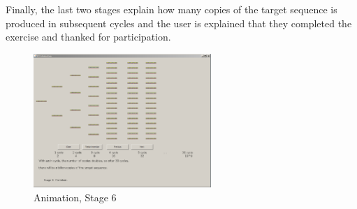 Finally, the last two stages explain how many copies of the target sequence is produced in subsequent cycles and the user is explained that they completed the exercise and thanked for participation.

\begin{figure}[!t]
  \begin{center}
	\includegraphics[width=0.6\textwidth]{./images/AnimImpl/Stage6.png}
    \caption{
      \label{fig:AnimImpl:stage6}
      Animation, Stage 6
    }
  \end{center}
\end{figure}
